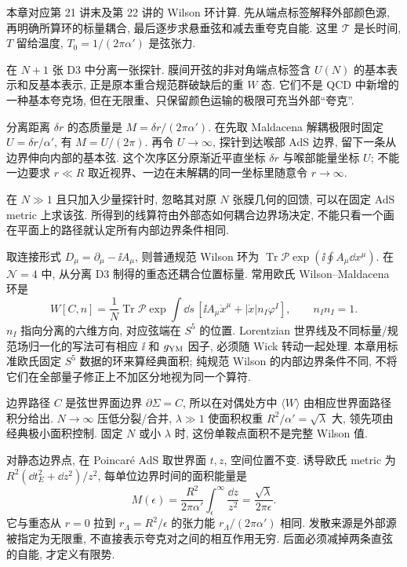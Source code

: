 本章对应第 21 讲末及第 22 讲的 Wilson 环计算. 先从端点标签解释外部颜色源, 再明确所算环的标量耦合, 最后逐步求悬垂弦和减去重夸克自能. 这里 $\mathcal T$ 是长时间, $T$ 留给温度, $T_0=1/(2\pi\alpha')$ 是弦张力.

在 $N+1$ 张 D3 中分离一张探针. 膜间开弦的非对角端点标签含 $U(N)$ 的基本表示和反基本表示, 正是原本重合规范群破缺后的重 $W$ 态. 它们不是 QCD 中新增的一种基本夸克场, 但在无限重、只保留颜色运输的极限可充当外部“夸克”.

分离距离 $\delta r$ 的态质量是 $M=\delta r/(2\pi\alpha')$. 在先取 Maldacena 解耦极限时固定 $U=\delta r/\alpha'$, 有 $M=U/(2\pi)$. 再令 $U\to\infty$, 探针到达喉部 AdS 边界, 留下一条从边界伸向内部的基本弦. 这个次序区分原渐近平直坐标 $\delta r$ 与喉部能量坐标 $U$; 不能一边要求 $r\ll R$ 取近视界、一边在未解耦的同一坐标里随意令 $r\to\infty$.

在 $N\gg1$ 且只加入少量探针时, 忽略其对原 $N$ 张膜几何的回馈, 可以在固定 AdS metric 上求该弦. 所得到的线算符由外部态如何耦合边界场决定, 不能只看一个画在平面上的路径就认定所有内部边界条件相同.

取连接形式 $D_\mu=\partial_\mu-\ii A_\mu$, 则普通规范 Wilson 环为 $\operatorname{Tr}\mathcal P\exp(\ii\oint A_\mu\dd x^\mu)$. 在 $\mathcal N=4$ 中, 从分离 D3 制得的重态还耦合位置标量. 常用欧氏 Wilson--Maldacena 环是
\[
W[C,n]=\frac1N\operatorname{Tr}\mathcal P
\exp\int\dd s\,[\ii A_\mu\dot x^\mu+
|\dot x|n_I\varphi^I],\qquad n_In_I=1.
\]
$n_I$ 指向分离的六维方向, 对应弦端在 $S^5$ 的位置. Lorentzian 世界线及不同标量/规范场归一化的写法可有相应 $\ii$ 和 $g_{\rm YM}$ 因子, 必须随 Wick 转动一起处理. 本章用标准欧氏固定 $S^5$ 数据的环来算经典面积; 纯规范 Wilson 的内部边界条件不同, 不将它们在全部量子修正上不加区分地视为同一个算符.

边界路径 $C$ 是弦世界面边界 $\partial\Sigma=C$, 所以在对偶处方中 $\langle W\rangle$ 由相应世界面路径积分给出. $N\to\infty$ 压低分裂/合并, $\lambda\gg1$ 使面积权重 $R^2/\alpha'=\sqrt\lambda$ 大, 领先项由经典极小面积控制. 固定 $N$ 或小 $\lambda$ 时, 这份单鞍点面积不是完整 Wilson 值.

对静态边界点, 在 Poincaré AdS 取世界面 $t,z$, 空间位置不变. 诱导欧氏 metric 为 $R^2(\dd t_E^2+\dd z^2)/z^2$, 每单位边界时间的面积能量是
\[
M(\epsilon)=\frac{R^2}{2\pi\alpha'}
\int_\epsilon^\infty\frac{\dd z}{z^2}
=\frac{\sqrt\lambda}{2\pi\epsilon}.
\]
它与重态从 $r=0$ 拉到 $r_\Lambda=R^2/\epsilon$ 的张力能 $r_\Lambda/(2\pi\alpha')$ 相同. 发散来源是外部源被指定为无限重, 不直接表示夸克对之间的相互作用无穷. 后面必须减掉两条直弦的自能, 才定义有限势.

